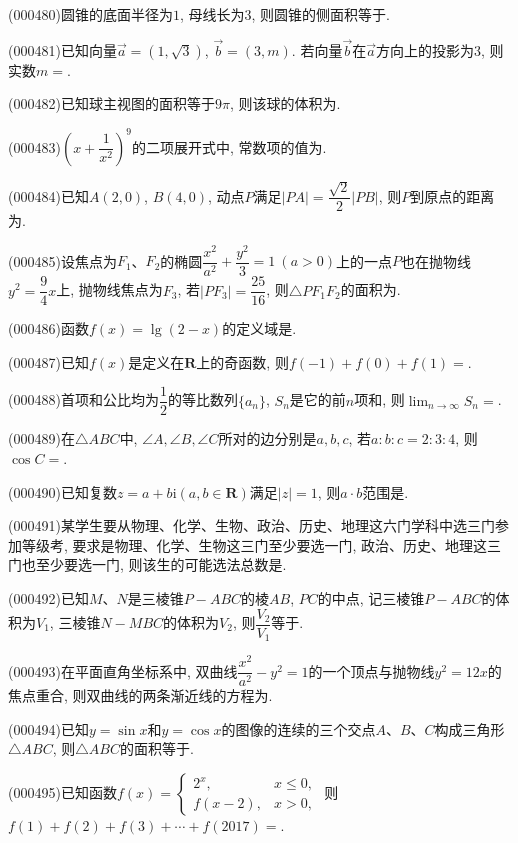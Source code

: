 \item (000480)圆锥的底面半径为$1$, 母线长为$3$, 则圆锥的侧面积等于.
\item (000481)已知向量$\overrightarrow{a}=(1,\sqrt{3})$, $\overrightarrow{b}=(3,m)$. 若向量$\overrightarrow{b}$在$\overrightarrow{a}$方向上的投影为$3$, 则实数$m=$.
\item (000482)已知球主视图的面积等于$9\pi$, 则该球的体积为.
\item (000483)$(x+\dfrac{1}{x^2})^9$的二项展开式中, 常数项的值为.
\item (000484)已知$A(2,0)$, $B(4,0)$, 动点$P$满足$|PA|=\dfrac{\sqrt2} 2|PB|$, 则$P$到原点的距离为.
\item (000485)设焦点为$F_1$、$F_2$的椭圆$\dfrac{x^2}{a^2}+\dfrac{y^2}3=1 \ (a>0)$上的一点$P$也在抛物线$y^2=\dfrac94x$上, 抛物线焦点为$F_3$, 若$|PF_3|=\dfrac{25}{16}$, 则$\triangle PF_1F_2$的面积为.
\item (000486)函数$f(x)=\lg(2-x)$的定义域是.
\item (000487)已知$f(x)$是定义在$\mathbf{R}$上的奇函数, 则$f(-1)+f(0)+f(1)=$.
\item (000488)首项和公比均为$\dfrac12$的等比数列$\{a_n\}$, $S_n$是它的前$n$项和, 则$\displaystyle\lim_{n\to\infty}S_n=$.
\item (000489)在$\triangle ABC$中, $\angle A,\angle B,\angle C$所对的边分别是$a,b,c$, 若$a:b:c=2:3:4 $, 则$\cos C=$.
\item (000490)已知复数$z=a+b\mathrm{i}(a,b\in \mathbf{R})$满足$|z|=1$, 则$a\cdot b$范围是.
\item (000491)某学生要从物理、化学、生物、政治、历史、地理这六门学科中选三门参加等级考, 要求是物理、化学、生物这三门至少要选一门, 政治、历史、地理这三门也至少要选一门, 则该生的可能选法总数是.
\item (000492)已知$M$、$N$是三棱锥$P-ABC$的棱$AB$, $PC$的中点, 记三棱锥$P-ABC$的体积为$V_1$, 三棱锥$N-MBC$的体积为$V_2$, 则$\dfrac{V_2}{V_1}$等于.
\item (000493)在平面直角坐标系中, 双曲线$\dfrac{x^2}{a^2}-y^2=1 $的一个顶点与抛物线$y^2=12x$的焦点重合, 则双曲线的两条渐近线的方程为.
\item (000494)已知$y=\sin x$和$y=\cos x$的图像的连续的三个交点$A$、$B$、$C$构成三角形$\triangle ABC$, 则$\triangle ABC$的面积等于.
\item (000495)已知函数$f(x)=\begin{cases} 2^x, & x\le 0, \\ f(x-2), & x>0, \end{cases}$ 则$f(1)+f(2)+f(3)+\cdots+f(2017)=$.
